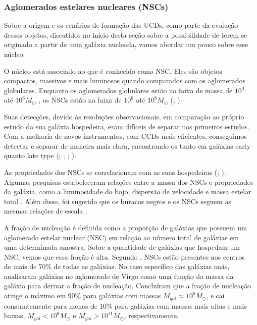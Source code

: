 \subsubsection{Aglomerados estelares nucleares (NSCs)}\label{subsubsection:NSC}
Sobre a origem e os cenários de formação das UCDs, como parte da evolução desses objetos, discutidos no início desta seção sobre a possibilidade de terem se originado a partir de uma galáxia nucleada, vamos abordar um pouco sobre esse núcleo.

O núcleo está associado ao que é conhecido como \ac{NSC}. Eles são objetos compactos, massivos e mais luminosos quando comparados com os aglomerados globulares. Enquanto os aglomerados globulares estão na faixa de massa de $10^4$ até $10^6 M_{\odot}$ \citep{Masters_2010}, os NSCs estão na faixa de $10^6$ até $10^8 M_{\odot}$ (\citealp{Spengler_2017}; \citealp{Georgiev_2016}).

Suas detecções, devido às resoluções observacionais, em comparação ao próprio estudo da sua galáxia hospedeira, eram difíceis de separar nos primeiros estudos. Com a melhoria de novos instrumentos, com CCDs mais eficientes, conseguimos detectar e separar de maneira mais clara, encontrando-os tanto em galáxias early quanto late type (\citealp{Phillips_1996}; \citealp{Carollo_1997}; \citealp{Matthews_1999}; \citealp{boker_2002}).

As propriedades dos NSCs se correlacionam com as suas hospedeiras (\citealp{Balcells_2003}; \citealp{Graham_2003}). Algumas pesquisas estabeleceram relações entre a massa dos NSCs e propriedades da galáxia, como a luminosidade do bojo, dispersão de velocidade e massa estelar total \citep{Ferrarese_2006, Wehner_2006, Rossa_2006}. Além disso, foi sugerido que os buracos negros e os NSCs seguem as mesmas relações de escala \citep{Ferrarese_2006}.

A fração de nucleação é definida como a proporção de galáxias que possuem um aglomerado estelar nuclear (NSC) em relação ao número total de galáxias em uma determinada amostra. Sobre a quantidade de galáxias que hospedam um NSC, vemos que essa fração é alta. Segundo \cite{Boker_2010}, NSCs estão presentes nos centros de mais de 70\% de todas as galáxias. No caso específico das galáxias anãs, \cite{Sanchez_2019} analisaram galáxias no aglomerado de Virgo como uma função da massa da galáxia para derivar a fração de nucleação. Concluíram que a fração de nucleação atinge o máximo em 90\% para galáxias com massas $M_{gal} \approx 10^9 M_{\odot}$, e cai constantemente para menos de 10\% para galáxias com massas mais altas e mais baixas, $M_{gal} < 10^6 M_{\odot}$ e $M_{gal} > 10^{11} M_{\odot}$, respectivamente.

